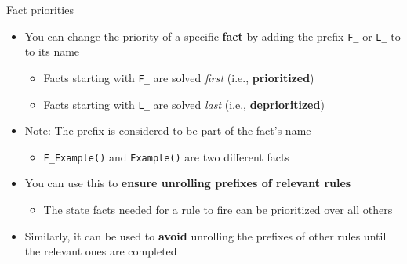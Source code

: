 \documentclass[11pt,aspectratio=169]{beamer}
\begin{document}
\begin{frame}[fragile]{Fact priorities}
    \begin{itemize}
        \item You can change the priority of a specific \textbf{fact} by adding 
              the prefix \verb|F_| or \verb|L_| to to its name
        \begin{itemize}
            \item Facts starting with \verb|F_| are solved \textit{first}
                  (i.e., \textbf{prioritized})
            \item Facts starting with \verb|L_| are solved \textit{last}
                  (i.e., \textbf{deprioritized})
        \end{itemize}
        \item Note: The prefix is considered to be part of the fact's name
        \begin{itemize}
            \item \verb|F_Example()| and \verb|Example()| are two different 
                  facts
        \end{itemize}
        \item You can use this to
              \textbf{ensure unrolling prefixes of relevant rules}
        \begin{itemize}
            \item The state facts needed for a rule to fire can be prioritized 
            over all others
        \end{itemize}
        \item Similarly, it can be used to \textbf{avoid} unrolling the 
              prefixes of other rules until the relevant ones are completed
    \end{itemize}
\end{frame}
\end{document}
